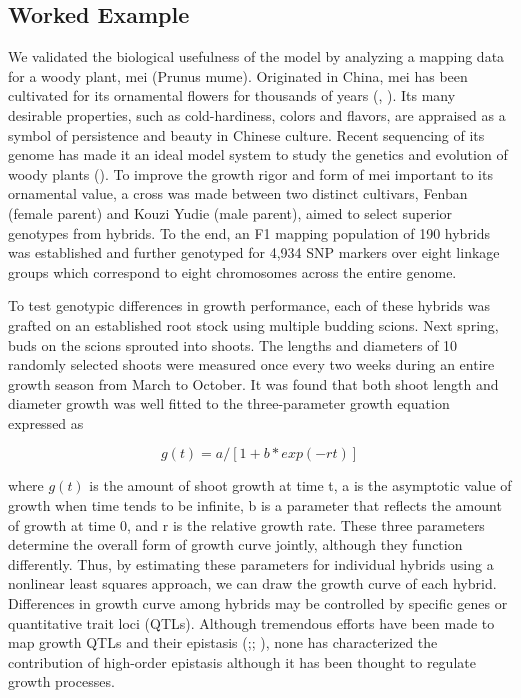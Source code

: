 \documentclass[11pt,]{book}
\theoremstyle{definition}
\theoremstyle{definition}
\theoremstyle{remark}
\begin{document}
\subsection{Worked Example}\label{worked-example}

We validated the biological usefulness of the model by analyzing a
mapping data for a woody plant, mei (Prunus mume). Originated in China,
mei has been cultivated for its ornamental flowers for thousands of
years (\cite{sun2013genome}, \cite{sun2014genetic}). Its many desirable
properties, such as cold-hardiness, colors and flavors, are appraised as
a symbol of persistence and beauty in Chinese culture. Recent sequencing
of its genome has made it an ideal model system to study the genetics
and evolution of woody plants (\cite{zhang2013epigenetic}). To improve
the growth rigor and form of mei important to its ornamental value, a
cross was made between two distinct cultivars, Fenban (female parent)
and Kouzi Yudie (male parent), aimed to select superior genotypes from
hybrids. To the end, an F1 mapping population of 190 hybrids was
established and further genotyped for 4,934 SNP markers over eight
linkage groups which correspond to eight chromosomes across the entire
genome.

To test genotypic differences in growth performance, each of these
hybrids was grafted on an established root stock using multiple budding
scions. Next spring, buds on the scions sprouted into shoots. The
lengths and diameters of 10 randomly selected shoots were measured once
every two weeks during an entire growth season from March to October. It
was found that both shoot length and diameter growth was well fitted to
the three-parameter growth equation expressed as

\begin{equation}
g(t) = a/[1+b*exp(-rt)]
\label{eq:growth-curve}
\end{equation}

where \(g(t)\) is the amount of shoot growth at time t, a is the
asymptotic value of growth when time tends to be infinite, b is a
parameter that reflects the amount of growth at time 0, and r is the
relative growth rate. These three parameters determine the overall form
of growth curve jointly, although they function differently. Thus, by
estimating these parameters for individual hybrids using a nonlinear
least squares approach, we can draw the growth curve of each hybrid.
Differences in growth curve among hybrids may be controlled by specific
genes or quantitative trait loci (QTLs). Although tremendous efforts
have been made to map growth QTLs and their epistasis
(\cite{ma2002response};\cite{wu2006functional};
\cite{li2012estimation}), none has characterized the contribution of
high-order epistasis although it has been thought to regulate growth
processes.
\end{document}

